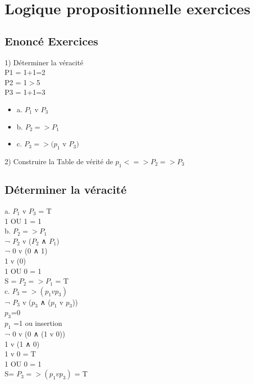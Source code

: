 \newpage

\chapter{Logique propositionnelle exercices}
\vspace{5mm} %

\section{Enoncé Exercices}
\vspace{5mm} %

1) Déterminer la véracité \\

P1 = 1+1=2  \\
P2 = 1$>$5 \\
P3 = 1+1=3 \\

\begin{itemize}
\item {a. $P_1$ v $P_3$}
\item {b. $P_2 => P_1$}
\item {c. $P_3 => (p_1$ v $P_3)$}
\end{itemize}

2) Construire la Table de vérité de $p_1 <=> P_2 => P_3$ \\

\vspace{5mm} %
\section{Déterminer la véracité}

a. $P_1$ v $P_3$ = T \\
1 OU 1 = 1\\

b. $P_2 => P_1$ \\
¬ $P_2$ v ($P_2$ ∧ $P_1$) \\
¬ 0 v (0 ∧ 1) \\
1 v (0) \\
1 OU 0 = 1\\
S = $P_2 => P_1$ = T \\

c. $P_3 => (p_1 v p_3)$ \\
¬ $P_3$ v ($p_3$ ∧ ($p_1$ v $p_3$)) \\
$p_3$=0 \\
$p_1$ =1 ou insertion \\
¬ 0 v (0 ∧ (1 v 0)) \\
1 v (1 ∧ 0) \\
1 v 0 = T \\
1 OU 0 = 1 \\
S= $P_3 => (p_1 v p_3)$ = T\\

